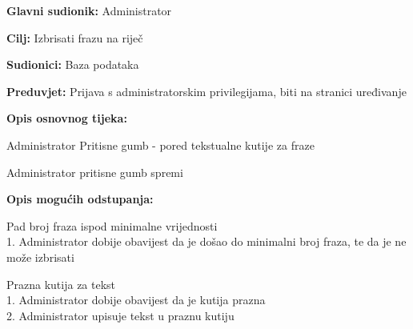 					\noindent {}
					\begin{packed_item}
						\item \textbf{Glavni sudionik:} Administrator
						\item \textbf{Cilj:} Izbrisati frazu na riječ
						\item \textbf{Sudionici:} Baza podataka
						\item \textbf{Preduvjet:} Prijava s administratorskim privilegijama, biti na stranici uređivanje
						\item \textbf{Opis osnovnog tijeka:}
						\begin{packed_enum}
							\item Administrator Pritisne gumb - pored tekstualne kutije za fraze
							\item Administrator pritisne gumb spremi
						\end{packed_enum}
						\item \textbf{Opis mogućih odstupanja:}
						\begin{packed_item}
							\item [1.a] Pad broj fraza ispod minimalne vrijednosti
							\\1. Administrator dobije obavijest da je došao do minimalni broj fraza, te da je ne može izbrisati
							\item [2.a] Prazna kutija za tekst
							\\1. Administrator dobije obavijest da je kutija prazna
							\\2. Administrator upisuje tekst u praznu kutiju
						\end{packed_item}
					\end{packed_item}
					
